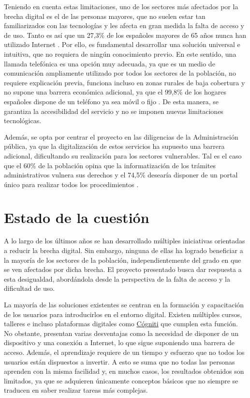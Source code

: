    Teniendo en cuenta estas limitaciones, uno de los sectores más afectados por la brecha digital es el de las personas mayores, que no suelen estar tan familiarizados con las tecnologías y les afecta en gran medida la falta de acceso y de uso. 
    Tanto es así que un 27,3\% de los españoles mayores de 65 años nunca han utilizado Internet \cite{ref2}. 
    Por ello, es fundamental desarrollar una solución universal e intuitiva, que no requiera de ningún conocimiento previo.
    En este sentido, una llamada telefónica es una opción muy adecuada, ya que es un medio de comunicación ampliamente utilizado por todos los sectores de la población, no requiere explicación previa, funciona incluso en zonas rurales de baja cobertura y no supone una barrera económica adicional, ya que el 99,8\% de los hogares españoles dispone de un teléfono ya sea móvil o fijo \cite{ref3}. 
    De esta manera, se garantiza la accesibilidad del servicio y no se imponen nuevas limitaciones tecnológicas.

    Además, se opta por centrar el proyecto en las diligencias de la Administración pública, ya que la digitalización de estos servicios ha supuesto una barrera adicional, dificultando su realización para los sectores vulnerables. 
    Tal es el caso que el 60\% de la población opina que la informatización de los trámites administrativos vulnera sus derechos y el 74,5\% desearía disponer de un portal único para realizar todos los procedimientos \cite{ref4}.

\section{Estado de la cuestión}
    A lo largo de los últimos años se han desarrollado múltiples iniciativas orientadas a reducir la brecha digital. 
    Sin embargo, ninguna de ellas ha logrado beneficiar a la mayoría de los sectores de la población, independientemente del grado en que se ven afectados por dicha brecha. 
    El proyecto presentado busca dar respuesta a esta desigualdad, abordándola desde la perspectiva de la falta de acceso y la dificultad de uso.

    La mayoría de las soluciones existentes se centran en la formación y capacitación de los usuarios para introducirlos en el entorno digital. 
    Existen múltiples cursos, talleres e incluso plataformas digitales como \href{https://cogniti.es/}{Cógniti} \cite{ref5} que cumplen esta función. 
    No obstante, presentan varias desventajas como la necesidad de disponer de un dispositivo y una conexión a Internet, lo que sigue suponiendo una barrera de acceso. 
    Además, el aprendizaje requiere de un tiempo y esfuerzo que no todos los usuarios están dispuestos a invertir. 
    A esto se suma que no todas las personas aprenden con la misma facilidad y, en muchos casos, los resultados obtenidos son limitados, ya que se adquieren únicamente conceptos básicos que no siempre se traducen en saber realizar tareas más complejas.


